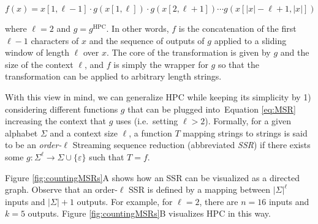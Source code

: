 \documentclass[
  11pt,
  twoside,
  BCOR=10mm,
  listof=totoc]{scrbook}
\begin{document}
\begin{equation}
  f(x) = x[1,\ell-1]\cdot g(x[1,\ell]) \cdot g(x[2, \ell+1])\cdots g(x[|x|-\ell+1,|x|]) 
  \label{eq:MSR}
\end{equation}

where \(\ell = 2\) and \(g=g^\text{HPC}\). In other words, \(f\) is the concatenation of the first \(\ell-1\) characters of \(x\) and the sequence of outputs of \(g\) applied to a sliding window of length \(\ell\) over \(x\). The core of the transformation is given by \(g\) and the size of the context \(\ell\), and \(f\) is simply the wrapper for \(g\) so that the transformation can be applied to arbitrary length strings.

With this view in mind, we can generalize HPC while keeping its simplicity by 1) considering different functions \(g\) that can be plugged into~Equation \eqref{eq:MSR} increasing the context that \(g\) uses (i.e.~setting \(\ell>2\)). Formally, for a given alphabet \(\Sigma\) and a context size \(\ell\), a function \(T\) mapping strings to strings is said to be an \emph{order-}\(\ell\) Streaming sequence reduction (abbreviated \emph{SSR}) if there exists some \(g : \Sigma^\ell\rightarrow\Sigma\cup\{\varepsilon\}\) such that \(T=f\).

Figure \ref{fig:countingMSRs}A shows how an SSR can be visualized as a directed graph. Observe that an order-\(\ell\) SSR is defined by a mapping between \(|\Sigma|^\ell\) inputs and \(|\Sigma| + 1\) outputs. For example, for \(\ell=2\), there are \(n=16\) inputs and \(k=5\) outputs. Figure \ref{fig:countingMSRs}B visualizes HPC in this way.
\end{document}
